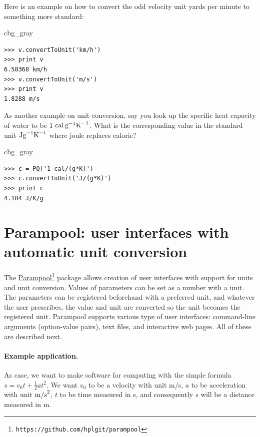 \documentclass[graybox,envcountchap,sectrefs,final]{svmonodo}
\newenvironment{_cod_tight}[1]{
   \def\FrameCommand{\colorbox{#1}}
   \FrameRule0.6pt\MakeFramed {\FrameRestore}\vskip3mm}
   {\vskip0mm\endMakeFramed}
\newenvironment{cod}[1]{
\bgroup\rmfamily
\fboxsep=0mm\relax
\begin{_cod_tight}{#1}
\list{}{\parsep=-2mm\parskip=0mm\topsep=0pt\leftmargin=2mm
\rightmargin=2\leftmargin\leftmargin=4pt\relax}
\item\relax}
{\endlist\end{_cod_tight}\egroup}
\begin{document}
Here is an example on how to convert the odd velocity unit yards per
minute to something more standard:

\begin{cod}{cbg_gray}\begin{Verbatim}[numbers=none,fontsize=\fontsize{9pt}{9pt},baselinestretch=0.95,xleftmargin=2mm]
>>> v.convertToUnit('km/h')
>>> print v
6.58368 km/h
>>> v.convertToUnit('m/s')
>>> print v
1.8288 m/s
\end{Verbatim}
\end{cod}
\noindent

As another example on unit conversion,
say you look up the specific heat capacity of water to
be 1 $\hbox{cal}\, \hbox{g}^{-1}\hbox{K}^{-1}$. What is the
corresponding value in the standard unit $\hbox{Jg}^{-1}\hbox{K}^{-1}$
where joule replaces calorie?

\begin{cod}{cbg_gray}\begin{Verbatim}[numbers=none,fontsize=\fontsize{9pt}{9pt},baselinestretch=0.95,xleftmargin=2mm]
>>> c = PQ('1 cal/(g*K)')
>>> c.convertToUnit('J/(g*K)')
>>> print c
4.184 J/K/g
\end{Verbatim}
\end{cod}
\noindent

\section{Parampool: user interfaces with automatic unit conversion}
\label{scale:parampool}


The \href{{https://github.com/hplgit/parampool}}{Parampool}\footnote{\texttt{https://github.com/hplgit/parampool}} package allows
creation of user interfaces with support for units and unit
conversion. Values of parameters can be set as a number with a
unit. The parameters can be registered beforehand with a preferred
unit, and whatever the user prescribes, the value and unit are
converted so the unit becomes the registered unit. Parampool supports
various type of user interfaces: command-line arguments (option-value
pairs), text files, and interactive web pages. All of these
are described next.

\paragraph{Example application.}
As case, we want to make software for computing with the simple
formula $s=v_0t + \frac{1}{2}at^2$. We want $v_0$ to be a velocity
with unit m/s, $a$ to be acceleration with unit $\hbox{m/s}^2$, $t$ to be
time measured in s, and consequently $s$ will be a distance measured in m.
\end{document}
